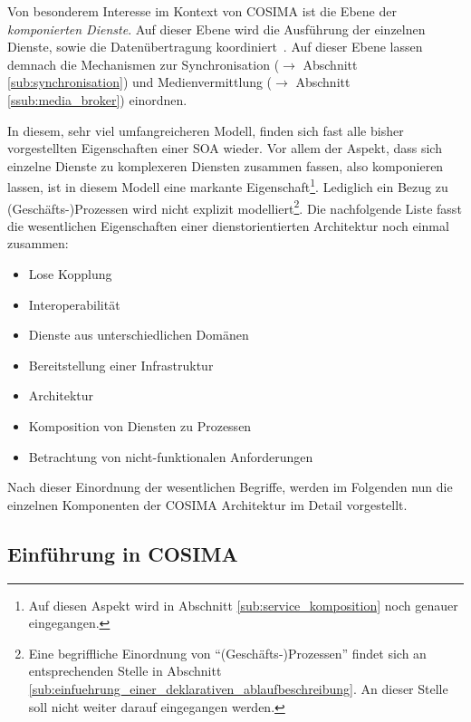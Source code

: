   Von besonderem Interesse im Kontext von COSIMA ist die Ebene der \emph{komponierten Dienste}. Auf dieser Ebene wird die Ausführung der einzelnen Dienste, sowie die Datenübertragung koordiniert~\cite[S. 8]{service_oriented_computing}. Auf dieser Ebene lassen demnach die Mechanismen zur Synchronisation ($\to$ Abschnitt \ref{sub:synchronisation}) und Medienvermittlung ($\to$ Abschnitt \ref{ssub:media_broker}) einordnen.
  
  In diesem, sehr viel umfangreicheren Modell, finden sich fast alle bisher vorgestellten Eigenschaften einer SOA wieder. Vor allem der Aspekt, dass sich einzelne Dienste zu komplexeren Diensten zusammen fassen, also komponieren lassen, ist in diesem Modell eine markante Eigenschaft\footnote{Auf diesen Aspekt wird in Abschnitt \ref{sub:service_komposition} noch genauer eingegangen.}. Lediglich ein Bezug zu (Geschäfts-)Prozessen wird nicht explizit modelliert\footnote{Eine begriffliche Einordnung von "`(Geschäfts-)Prozessen"' findet sich an entsprechenden Stelle in Abschnitt \ref{sub:einfuehrung_einer_deklarativen_ablaufbeschreibung}. An dieser Stelle soll nicht weiter darauf eingegangen werden.}. Die nachfolgende Liste fasst die wesentlichen Eigenschaften einer dienstorientierten Architektur noch einmal zusammen:

  \begin{itemize}
    \item Lose Kopplung
    \item Interoperabilität
    \item Dienste aus unterschiedlichen Domänen
    \item Bereitstellung einer Infrastruktur
    \item Architektur
    \item Komposition von Diensten zu Prozessen
    \item Betrachtung von nicht-funktionalen Anforderungen
  \end{itemize}


  Nach dieser Einordnung der wesentlichen Begriffe, werden im Folgenden nun die einzelnen Komponenten der COSIMA Architektur im Detail vorgestellt.


\pagebreak

\subsection{Einführung in COSIMA} %
\label{sub:einfuehrung}

